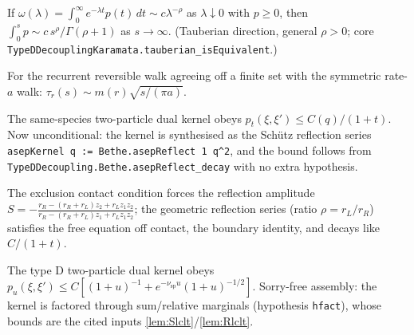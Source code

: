 \begin{theorem}\label{thm:karamata}
  \leanok
  If $\omega(\lambda) = \int_0^\infty e^{-\lambda t}p(t)\,dt \sim c\lambda^{-\rho}$ as
  $\lambda \downarrow 0$ with $p \ge 0$, then
  $\int_0^s p \sim c\,s^\rho/\Gamma(\rho+1)$ as $s \to \infty$.
  (Tauberian direction, general $\rho > 0$; core
  \texttt{TypeDDecouplingKaramata.tauberian\_isEquivalent}.)
\end{theorem}

\begin{lemma}\label{lem:tau}
  \leanok
  For the recurrent reversible walk agreeing off a finite set with the symmetric
  rate-$a$ walk: $\tau_r(s) \sim m(r)\sqrt{s/(\pi a)}$.
\end{lemma}

\begin{lemma}\label{lem:asep}
  \leanok
  The same-species two-particle dual kernel obeys $p_t(\xi,\xi') \le C(q)/(1+t)$.
  Now unconditional: the kernel is synthesised as the Sch\"utz reflection series
  \texttt{asepKernel q := Bethe.asepReflect 1 q\textasciicircum2}, and the bound follows
  from \texttt{TypeDDecoupling.Bethe.asepReflect\_decay} with no extra hypothesis.
\end{lemma}

\begin{lemma}\label{lem:bethe}
  \leanok
  The exclusion contact condition forces the reflection amplitude
  $S = -\frac{r_R-(r_R+r_L)z_2+r_Lz_1z_2}{r_R-(r_R+r_L)z_1+r_Lz_1z_2}$; the geometric
  reflection series (ratio $\rho = r_L/r_R$) satisfies the free equation off contact,
  the boundary identity, and decays like $C/(1+t)$.
\end{lemma}

\begin{theorem}\label{thm:kernel}
  \leanok
  The type D two-particle dual kernel obeys
  $p_u(\xi,\xi') \le C[(1+u)^{-1} + e^{-\nu_{\mathrm{sp}}u}(1+u)^{-1/2}]$.
  Sorry-free assembly: the kernel is factored through sum/relative marginals
  (hypothesis \texttt{hfact}), whose bounds are the cited inputs
  \ref{lem:Slclt}/\ref{lem:Rlclt}.
\end{theorem}


